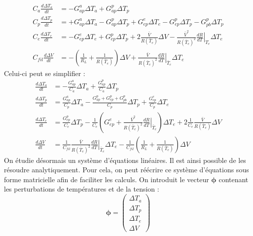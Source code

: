 \begin{align}
\label{tempo}
C_a \frac{d \Delta T_a}{d t}
	&= -G_{ap}^a \Delta T_a + G_{ap}^p \Delta T_p 
	\nonumber \\
C_p \frac{d \Delta T_p}{d t} 
	&= +G_{ap}^a \Delta T_a - G_{ap}^p \Delta T_p
	+ G_{ep}^e \Delta T_e - G_{ep}^p \Delta T_p
	- G_{pb}^p \Delta T_p
	\nonumber \\
C_e \frac{d \Delta T_e}{d t}
	&= - G_{ep}^e \Delta T_e + G_{ep}^p \Delta T_p
	+2\frac{\bar{V}}{R(\bar{T}_e)} \Delta V - \frac{\bar{V}^2}{R(\bar{T}_e)^2} \left.\frac{d R}{d T}\right\vert_{T_e} \Delta T_e
 	\nonumber \\
C_{fil} \frac{d \Delta V}{d t} &= - \left( \frac{1}{R_L} + \frac{1}{R(\bar{T}_e)} \right) \Delta V + \frac{\bar{V}}{R(\bar{T}_e)^2} \left.\frac{d R}{d T}\right\vert_{\bar{T}_e} \Delta T_e
\end{align}
Celui-ci peut se simplifier :
\begin{align}
\label{tempo-bis}
\frac{d \Delta T_a}{d t}
	&= -\frac{G_{ap}^a}{C_a} \Delta T_a + \frac{G_{ap}^p}{C_a} \Delta T_p 
	\nonumber \\
\frac{d \Delta T_p}{d t} 
	&= \frac{G_{ap}^a}{C_p} \Delta T_a - \frac{G_{ap}^p+G_{ep}^p+G_{pb}^p}{C_p} \Delta T_p	+ \frac{G_{ep}^e }{C_p}\Delta T_e
	\nonumber \\
\frac{d \Delta T_e}{d t}
	&= \frac{G_{ep}^p}{C_e} \Delta T_p - \frac{1}{C_e} \left(G_{ep}^e + \frac{\bar{V}^2}{R(\bar{T}_e)^2} \left.\frac{d R}{d T}\right\vert_{\bar{T}_e}\right) \Delta T_e 
	+2 \frac{1}{C_e} \frac{\bar{V}}{R(\bar{T}_e)} \Delta V
 	\nonumber \\
\frac{d \Delta V}{d t} &= \frac{1}{C_{fil}} \frac{\bar{V}}{R(\bar{T}_e)^2} \left.\frac{d R}{d T}\right\vert_{\bar{T}_e} \Delta T_e - \frac{1}{C_{fil}}\left( \frac{1}{R_L} + \frac{1}{R(\bar{T}_e)} \right) \Delta V 
\end{align}
On étudie désormais un système d'équations linéaires. Il est ainsi possible de les résoudre analytiquement. Pour cela, on peut réécrire ce système d'équations sous forme matricielle afin de faciliter les calculs. On introduit le vecteur $\bm{\phi}$ contenant les perturbations de températures et de la tension :
\begin{equation}
\label{phi}
\bm{\phi} = 
\left( \begin{array}{c}
\Delta T_a\\
\Delta T_p\\
\Delta T_e\\
\Delta V
\end{array} \right)
\end{equation}

